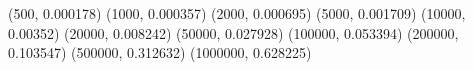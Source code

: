 (500, 0.000178) (1000, 0.000357) (2000, 0.000695) (5000, 0.001709) (10000, 0.00352) (20000, 0.008242) (50000, 0.027928) (100000, 0.053394) (200000, 0.103547) (500000, 0.312632) (1000000, 0.628225) 